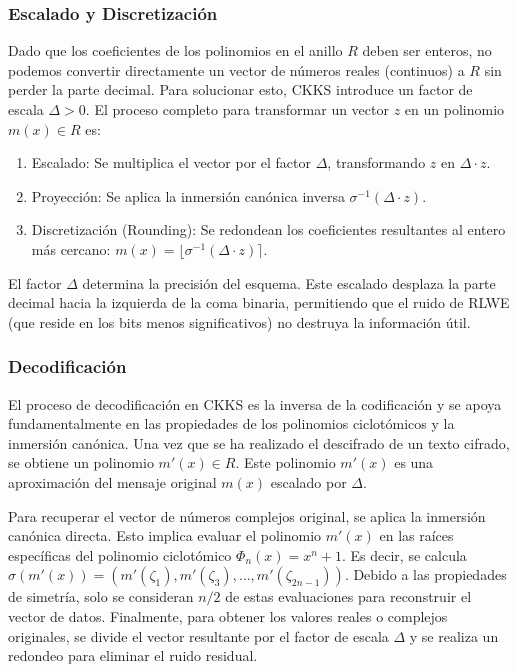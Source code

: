 \subsubsection{Escalado y Discretización}

Dado que los coeficientes de los polinomios en el anillo $R$ deben ser enteros, no podemos convertir directamente un vector de números reales (continuos) a $R$ sin perder la parte decimal. Para solucionar esto, CKKS introduce un factor de escala $\Delta > 0$. El proceso completo para transformar un vector $z$ en un polinomio $m(x) \in R$ es:

\begin{enumerate}
   \item Escalado: Se multiplica el vector por el factor $\Delta$, transformando $z$ en $\Delta \cdot z$.
   \item Proyección: Se aplica la inmersión canónica inversa $\sigma^{-1}(\Delta \cdot z)$.
   \item Discretización (Rounding): Se redondean los coeficientes resultantes al entero más cercano: $m(x) = \lfloor \sigma^{-1}(\Delta \cdot z) \rceil$.
\end{enumerate}

El factor $\Delta$ determina la precisión del esquema. Este escalado desplaza la parte decimal hacia la izquierda de la coma binaria, permitiendo que el ruido de RLWE (que reside en los bits menos significativos) no destruya la información útil.

\subsubsection{Decodificación}
El proceso de decodificación en CKKS es la inversa de la codificación y se apoya fundamentalmente en las propiedades de los polinomios ciclotómicos y la inmersión canónica. Una vez que se ha realizado el descifrado de un texto cifrado, se obtiene un polinomio $m'(x) \in R$. Este polinomio $m'(x)$ es una aproximación del mensaje original $m(x)$ escalado por $\Delta$.

Para recuperar el vector de números complejos original, se aplica la inmersión canónica directa. Esto implica evaluar el polinomio $m'(x)$ en las raíces específicas del polinomio ciclotómico $\Phi_n(x) = x^n + 1$. Es decir, se calcula $\sigma(m'(x)) = (m'(\zeta_1), m'(\zeta_3), \dots, m'(\zeta_{2n-1}))$. Debido a las propiedades de simetría, solo se consideran $n/2$ de estas evaluaciones para reconstruir el vector de datos. Finalmente, para obtener los valores reales o complejos originales, se divide el vector resultante por el factor de escala $\Delta$ y se realiza un redondeo para eliminar el ruido residual. 

